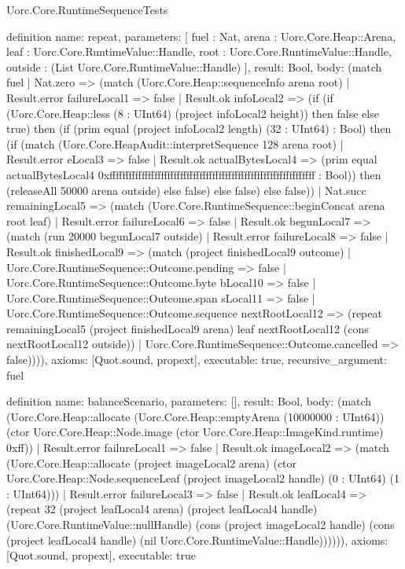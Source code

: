 \begin{lexlean}{Uorc.Core.RuntimeSequenceTests}
\begin{semanticmodule}
definition{
  name: repeat,
  parameters: [
    fuel : Nat,
    arena : Uorc.Core.Heap::Arena,
    leaf : Uorc.Core.RuntimeValue::Handle,
    root : Uorc.Core.RuntimeValue::Handle,
    outside : (List Uorc.Core.RuntimeValue::Handle)
  ],
  result: Bool,
  body: (match fuel
    | Nat.zero => (match (Uorc.Core.Heap::sequenceInfo arena root)
      | Result.error failureLocal1 => false
      | Result.ok infoLocal2 => (if (if (Uorc.Core.Heap::less (8 : UInt64) (project infoLocal2 height)) then false else true) then (if (prim equal (project infoLocal2 length) (32 : UInt64) : Bool) then (if (match (Uorc.Core.HeapAudit::interpretSequence 128 arena root)
        | Result.error eLocal3 => false
        | Result.ok actualBytesLocal4 => (prim equal actualBytesLocal4 0xffffffffffffffffffffffffffffffffffffffffffffffffffffffffffffffff : Bool)) then (releaseAll 50000 arena outside) else false) else false) else false))
    | Nat.succ remainingLocal5 => (match (Uorc.Core.RuntimeSequence::beginConcat arena root leaf)
      | Result.error failureLocal6 => false
      | Result.ok begunLocal7 => (match (run 20000 begunLocal7 outside)
        | Result.error failureLocal8 => false
        | Result.ok finishedLocal9 => (match (project finishedLocal9 outcome)
          | Uorc.Core.RuntimeSequence::Outcome.pending => false
          | Uorc.Core.RuntimeSequence::Outcome.byte bLocal10 => false
          | Uorc.Core.RuntimeSequence::Outcome.span sLocal11 => false
          | Uorc.Core.RuntimeSequence::Outcome.sequence nextRootLocal12 => (repeat remainingLocal5 (project finishedLocal9 arena) leaf nextRootLocal12 (cons nextRootLocal12 outside))
          | Uorc.Core.RuntimeSequence::Outcome.cancelled => false)))),
  axioms: [Quot.sound, propext],
  executable: true,
  recursive_argument: fuel
}

definition{
  name: balanceScenario,
  parameters: [],
  result: Bool,
  body: (match (Uorc.Core.Heap::allocate (Uorc.Core.Heap::emptyArena (10000000 : UInt64)) (ctor Uorc.Core.Heap::Node.image (ctor Uorc.Core.Heap::ImageKind.runtime) 0xff))
    | Result.error failureLocal1 => false
    | Result.ok imageLocal2 => (match (Uorc.Core.Heap::allocate (project imageLocal2 arena) (ctor Uorc.Core.Heap::Node.sequenceLeaf (project imageLocal2 handle) (0 : UInt64) (1 : UInt64)))
      | Result.error failureLocal3 => false
      | Result.ok leafLocal4 => (repeat 32 (project leafLocal4 arena) (project leafLocal4 handle) (Uorc.Core.RuntimeValue::nullHandle) (cons (project imageLocal2 handle) (cons (project leafLocal4 handle) (nil Uorc.Core.RuntimeValue::Handle)))))),
  axioms: [Quot.sound, propext],
  executable: true
}


\end{semanticmodule}
\end{lexlean}

